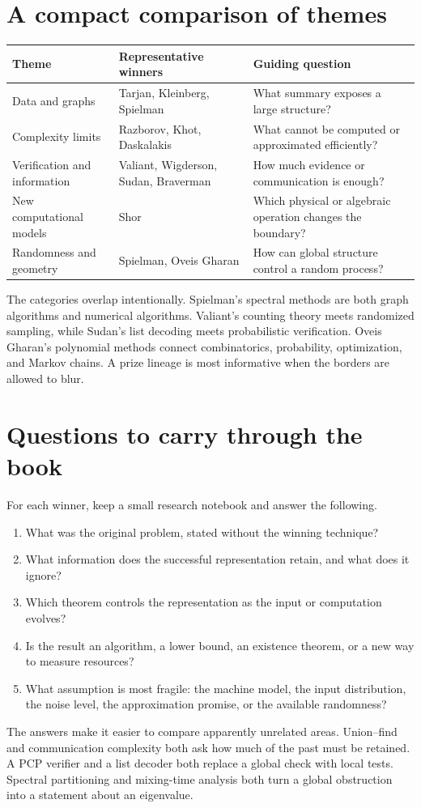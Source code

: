 \section{A compact comparison of themes}
\begin{center}
\begin{tabular}{p{}p{}p{}}
\toprule
Theme & Representative winners & Guiding question \\
\midrule
Data and graphs & Tarjan, Kleinberg, Spielman & What summary exposes a large structure? \\
Complexity limits & Razborov, Khot, Daskalakis & What cannot be computed or approximated efficiently? \\
Verification and information & Valiant, Wigderson, Sudan, Braverman & How much evidence or communication is enough? \\
New computational models & Shor & Which physical or algebraic operation changes the boundary? \\
Randomness and geometry & Spielman, Oveis Gharan & How can global structure control a random process? \\
\bottomrule
\end{tabular}
\end{center}
The categories overlap intentionally. Spielman's spectral methods are both graph algorithms and numerical algorithms. Valiant's counting theory meets randomized sampling, while Sudan's list decoding meets probabilistic verification. Oveis Gharan's polynomial methods connect combinatorics, probability, optimization, and Markov chains. A prize lineage is most informative when the borders are allowed to blur.

\section{Questions to carry through the book}
For each winner, keep a small research notebook and answer the following.
\begin{enumerate}
\item What was the original problem, stated without the winning technique?
\item What information does the successful representation retain, and what does it ignore?
\item Which theorem controls the representation as the input or computation evolves?
\item Is the result an algorithm, a lower bound, an existence theorem, or a new way to measure resources?
\item What assumption is most fragile: the machine model, the input distribution, the noise level, the approximation promise, or the available randomness?
\end{enumerate}
The answers make it easier to compare apparently unrelated areas. Union--find and communication complexity both ask how much of the past must be retained. A PCP verifier and a list decoder both replace a global check with local tests. Spectral partitioning and mixing-time analysis both turn a global obstruction into a statement about an eigenvalue.


